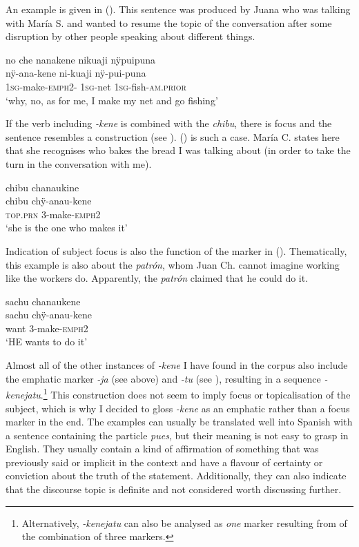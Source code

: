 An example is given in (). This sentence was produced by Juana who was talking with María S. and wanted to resume the topic of the conversation after some disruption by other people speaking about different things.

\ea\label{ex:NMLZ-s1}
\begingl
\glpreamble no che nanakene nikuaji nÿpuipuna\\
 nÿ-ana-kene ni-kuaji nÿ-pui-puna\\
 1\textsc{sg}-make-\textsc{emph}2- 1\textsc{sg}-net 1\textsc{sg}-fish-\textsc{am.prior}\\
\glft ‘why, no, as for me, I make my net and go fishing’
\endgl
{}
\xe

If the verb including \textit{-kene} is combined with the  \textit{chibu}, there is  focus and the sentence resembles a  construction (see ). () is such a case.  María C. states here that she recognises who bakes the bread I was talking about (in order to take the turn in the conversation with me).

\ea\label{ex:NMLZ-s2}
\begingl
\glpreamble chibu chanaukine\\
\gla chibu chÿ-anau-kene\\
\textsc{top.prn} 3-make-\textsc{emph}2\\
\glft ‘she is the one who makes it’
\endgl
\trailingcitation{[uxx-e120427l.127]}
\xe

Indication of subject focus is also the function of the marker in (). Thematically, this example is also about the \textit{patrón}, whom Juan Ch. cannot imagine working like the workers do. Apparently, the \textit{patrón} claimed that he could do it.

\ea\label{ex:NMLZ-c1}
\begingl
\glpreamble sachu chanaukene\\
\gla sachu chÿ-anau-kene\\
\glb want 3-make-\textsc{emph}2\\
\glft ‘HE wants to do it’
\endgl
\trailingcitation{[nxx-p630101g-1.094]}
\xe

Almost all of the other instances of \textit{-kene} I have found in the corpus also include the emphatic marker \textit{-ja} (see above) and  \textit{-tu} (see ), resulting in a sequence \textit{-kenejatu}.\footnote{Alternatively, \textit{-kenejatu} can also be analysed as \textit{one} marker resulting from  of the combination of three markers.} This construction does not seem to imply focus or topicalisation of the subject, which is why I decided to gloss \textit{-kene} as an emphatic rather than a focus marker in the end. The examples can usually be translated well into Spanish with a sentence containing the particle \textit{pues}, but their meaning is not easy to grasp in English. They usually contain a kind of affirmation of something that was previously said or implicit in the context and have a flavour of certainty or conviction about the truth of the statement. Additionally, they can also indicate that the discourse topic is definite and not considered worth discussing further.

